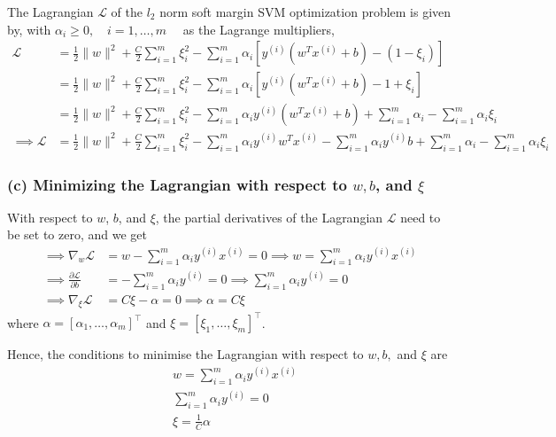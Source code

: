 The Lagrangian \( \mathcal{L} \) of the \( l_{2} \) norm soft margin SVM optimization problem is given by, with \( \alpha_{i} \geq 0, \quad i = 1, \ldots, m \quad \) as the Lagrange multipliers,
\begin{align*}
    \mathcal{L}
     & =
    \frac{1}{2}\|w\|^{2}+\frac{C}{2} \sum_{i=1}^{m} \xi_{i}^{2}
    - \sum_{i=1}^{m} \alpha_{i} \left[ y^{(i)}\left(w^{T} x^{(i)}+b\right) - (1-\xi_{i}) \right]
    \\ & =
    \frac{1}{2}\|w\|^{2}+\frac{C}{2} \sum_{i=1}^{m} \xi_{i}^{2}
    - \sum_{i=1}^{m} \alpha_{i} \left[ y^{(i)}\left(w^{T} x^{(i)}+b\right) - 1 + \xi_{i} \right]
    \\ & =
    \frac{1}{2}\|w\|^{2}+\frac{C}{2} \sum_{i=1}^{m} \xi_{i}^{2}
    - \sum_{i=1}^{m} \alpha_{i} y^{(i)} \left(w^{T} x^{(i)}+b\right)
    + \sum_{i=1}^{m} \alpha_{i} - \sum_{i=1}^{m} \alpha_{i} \xi_{i}
    \\
    \implies
    \mathcal{L}
     & =
    \frac{1}{2} \|w\|^{2}
    + \frac{C}{2} \sum_{i=1}^{m} \xi_{i}^{2}
    - \sum_{i=1}^{m} \alpha_{i} y^{(i)} w^{T} x^{(i)}
    - \sum_{i=1}^{m} \alpha_{i} y^{(i)} b
    + \sum_{i=1}^{m} \alpha_{i}
    - \sum_{i=1}^{m} \alpha_{i} \xi_{i}
\end{align*}

\subsubsection*{(c) Minimizing the Lagrangian with respect to \( w, b \), and \( \xi \)}

With respect to \( w \), \( b \), and \( \xi \), the partial derivatives of the Lagrangian \( \mathcal{L} \) need to be set to zero, and we get
\begin{align*}
    \implies
    \nabla_{w} \mathcal{L}
     & =
    w - \sum_{i=1}^{m} \alpha_{i} y^{(i)} x^{(i)}
    = 0
    \implies w = \sum_{i=1}^{m} \alpha_{i} y^{(i)} x^{(i)}
    \\
    \implies
    \frac{\partial \mathcal{L}}{\partial b}
     & =
    - \sum_{i=1}^{m} \alpha_{i} y^{(i)}
    = 0
    \implies \sum_{i=1}^{m} \alpha_{i} y^{(i)} = 0
    \\
    \implies
    \nabla_{\xi} \mathcal{L}
     & =
    C \xi - \alpha
    = 0
    \implies \alpha = C \xi
\end{align*}
where \( \alpha = {\left[ \alpha_{1}, \ldots, \alpha_{m} \right]}^\top \) and \( \xi = {\left[ \xi_{1}, \ldots, \xi_{m} \right]}^\top \).

Hence, the conditions to minimise the Lagrangian with respect to \( w, b, \) and \( \xi \) are
\begin{align*}
     &
    w
    =
    \sum_{i=1}^{m} \alpha_{i} y^{(i)} x^{(i)}
    \\ &
    \sum_{i=1}^{m} \alpha_{i} y^{(i)}
    =
    0
    \\ &
    \xi
    =
    \frac{1}{C} \alpha
\end{align*}

